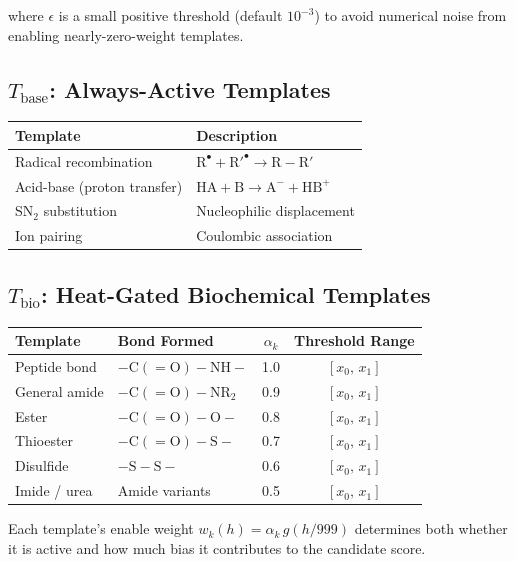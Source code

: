 \documentclass[11pt]{article}
\begin{document}
where $\epsilon$ is a small positive threshold (default $10^{-3}$) to avoid
numerical noise from enabling nearly-zero-weight templates.

\subsection{$T_{\mathrm{base}}$: Always-Active Templates}

\begin{center}
\begin{tabular}{ll}
\toprule
Template & Description \\
\midrule
Radical recombination & $\mathrm{R}^\bullet + \mathrm{R}'^\bullet \to \mathrm{R-R}'$ \\
Acid-base (proton transfer) & $\mathrm{HA} + \mathrm{B} \to \mathrm{A}^- + \mathrm{HB}^+$ \\
SN$_2$ substitution & Nucleophilic displacement \\
Ion pairing & Coulombic association \\
\bottomrule
\end{tabular}
\end{center}

\subsection{$T_{\mathrm{bio}}$: Heat-Gated Biochemical Templates}

\begin{center}
\begin{tabular}{llcc}
\toprule
Template & Bond Formed & $\alpha_k$ & Threshold Range \\
\midrule
Peptide bond & $\mathrm{-C(=O)-NH-}$ & 1.0 & $[x_0,\,x_1]$ \\
General amide & $\mathrm{-C(=O)-NR_2}$ & 0.9 & $[x_0,\,x_1]$ \\
Ester & $\mathrm{-C(=O)-O-}$ & 0.8 & $[x_0,\,x_1]$ \\
Thioester & $\mathrm{-C(=O)-S-}$ & 0.7 & $[x_0,\,x_1]$ \\
Disulfide & $\mathrm{-S-S-}$ & 0.6 & $[x_0,\,x_1]$ \\
Imide / urea & Amide variants & 0.5 & $[x_0,\,x_1]$ \\
\bottomrule
\end{tabular}
\end{center}

Each template's enable weight $w_k(h) = \alpha_k \, g(h/999)$ determines
both whether it is active and how much bias it contributes to the candidate
score.
\end{document}

